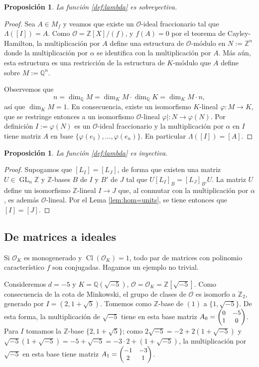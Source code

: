\documentclass[11pt,a4paper]{amsart}
\newcommand{\Q}{\mathbb{Q}}
\newcommand{\Z}{\mathbb{Z}}
\DeclareMathOperator{\GL}{GL}
\DeclareMathOperator{\CL}{Cl}
\numberwithin{equation}{section}
\theoremstyle{plain}
\newtheorem{prop}[equation]{Proposición}
\renewcommand{\O}{\mathcal{O}}
\begin{document}
\begin{prop} La función \eqref{def:lambda} es sobreyectiva.
\end{prop}
\begin{proof} Sea $A \in M_f$ y veamos que existe un $\O$-ideal
fraccionario tal que $\Lambda([I]) = A$. Como $\O = \Z[X]/(f)$,
y $f(A) = 0$ por el teorema de Cayley-Hamilton,
la multiplicación por $A$ define una estructura de $\O$-módulo
en $N:= \Z^n$ donde la multiplicación por $\alpha$ se identifica con
la multiplicación por $A$. Más aún, esta estructura
es una restricción de la estructura
de $K$-módulo que $A$ define sobre $M := \Q^n$.

Observemos que
\[
n = \dim_{\Q} M = \dim_K M \cdot \dim_\Q K = \dim_K M \cdot n,
\]
así que $\dim_K M = 1$. En consecuencia, existe un isomorfismo
$K$-lineal $\varphi \colon M \to K$, que se restringe
entonces a un isomorfismo $\O$-lineal $\varphi| \colon N \to \varphi(N)$.
Por definición $I := \varphi(N)$ es un $\O$-ideal fraccionario y
la multiplicación por $\alpha$ en $I$ tiene matriz $A$ en base
$\{\varphi(e_1), \ldots, \varphi(e_n)\}$. En particular
$\Lambda([I]) = [A]$.
\end{proof}

\begin{prop} La función \eqref{def:lambda} es inyectiva.
\end{prop}
\begin{proof} Supogamos que $[L_I] = [L_J]$, de forma que existen
una matriz $U \in \GL_n \Z$ y $\Z$-bases $B$ de $I$ y $B'$ de $J$
tal que $U [L_I]_{B} = [L_J]_{B'} U$. La matriz $U$ define
un isomorfismo $\Z$-lineal $I \to J$ que, al conmutar con la multiplicación
por $\alpha$, es además $\O$-lineal. Por el Lema \ref{lem:hom=units},
se tiene entonces que $[I] = [J]$.
\end{proof}

\subsection{De matrices a ideales} Si $\O_K$ es monogenerado
y $\CL(\O_K) = 1$, todo par de matrices con polinomio característico
$f$ son conjugadas. Hagamos un ejemplo no trivial.

Consideremos $d = -5$ y $K = \Q(\sqrt{-5})$, $\O = \O_K = \Z[\sqrt{-5}]$.
Como consecuencia de la cota de Minkowski,
el grupo de clases de $\O$ es isomorfo a $\Z_2$, generado por
$I = (2,1+\sqrt{5})$. Tomemos como $\Z$-base de $(1)$ a
$\{1,\sqrt{-5}\}$. De esta forma, la multiplicación de $\sqrt{-5}$
tiene en esta base matriz $A_0 =
\small\begin{pmatrix}0 & -5\\ 1 & 0\end{pmatrix}$.
Para $I$ tomamos la $\Z$-base $\{2,1+\sqrt{5}\}$;
como $2\sqrt{-5} = -2 + 2(1+\sqrt{-5})$ y $\sqrt{-5}(1+\sqrt{-5}) = -5 +
\sqrt{-5} = -3 \cdot 2 + (1+\sqrt{-5})$, la multiplicación
por $\sqrt{-5}$ en esta base tiene matriz $A_1 = \small\begin{pmatrix}
-1 & -3\\ 2 & 1 \end{pmatrix}$.
\end{document}
